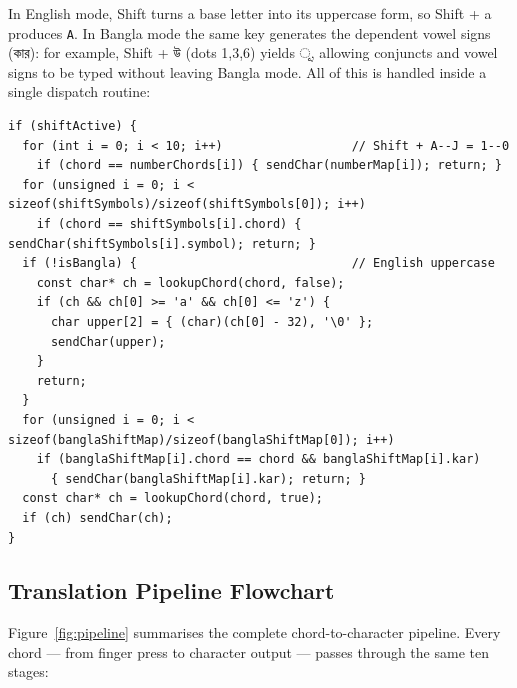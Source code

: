 \documentclass[11pt,a4paper,twoside]{article}
\newcommand{\bengali}[1]{#1}
\begin{document}
In English mode, Shift turns a base letter into its uppercase form, so
Shift + a produces \texttt{A}. In Bangla mode the same key
generates the dependent vowel signs (\bengali{কার}): for example,
Shift + \bengali{উ} (dots 1,3,6) yields \bengali{ূ}, allowing conjuncts
and vowel signs to be typed without leaving Bangla mode. All of this is
handled inside a single dispatch routine:

\begin{lstlisting}[caption=Shifted-chord dispatch.]
if (shiftActive) {
  for (int i = 0; i < 10; i++)                  // Shift + A--J = 1--0
    if (chord == numberChords[i]) { sendChar(numberMap[i]); return; }
  for (unsigned i = 0; i < sizeof(shiftSymbols)/sizeof(shiftSymbols[0]); i++)
    if (chord == shiftSymbols[i].chord) { sendChar(shiftSymbols[i].symbol); return; }
  if (!isBangla) {                              // English uppercase
    const char* ch = lookupChord(chord, false);
    if (ch && ch[0] >= 'a' && ch[0] <= 'z') {
      char upper[2] = { (char)(ch[0] - 32), '\0' };
      sendChar(upper);
    }
    return;
  }
  for (unsigned i = 0; i < sizeof(banglaShiftMap)/sizeof(banglaShiftMap[0]); i++)
    if (banglaShiftMap[i].chord == chord && banglaShiftMap[i].kar)
      { sendChar(banglaShiftMap[i].kar); return; }
  const char* ch = lookupChord(chord, true);
  if (ch) sendChar(ch);
}
\end{lstlisting}

\subsection{Translation Pipeline Flowchart}
Figure~\ref{fig:pipeline} summarises the complete chord-to-character
pipeline. Every chord --- from finger press to character output ---
passes through the same ten stages:
\end{document}
